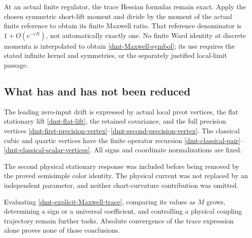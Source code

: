 At an actual finite regulator, the trace Hessian formulas
remain exact. Apply the chosen symmetric short-lift
moment and divide by the moment of the actual finite
reference to obtain its finite Maxwell ratio. That
reference denominator is \(1+O(e^{-cN})\), not
automatically exactly one. No finite Ward identity at
discrete momenta is interpolated to obtain
\eqref{dmt-Maxwell-symbol}; its use requires the stated
infinite kernel and symmetries, or the separately
justified local-limit passage.

\subsection{What has and has not been reduced}
\label{dmt-scope-section}

The leading zero-input drift is expressed by actual local
pivot vertices, the flat stationary lift
\eqref{dmt-flat-lift}, the retained covariance, and the
full precision vertices
\eqref{dmt-first-precision-vertex}--\eqref{dmt-second-precision-vertex}.
The classical cubic and quartic vertices have the finite
operator recursion
\eqref{dmt-classical-pair}--\eqref{dmt-classical-scalar-vertices}.
All signs and coordinate normalizations are fixed.

The second physical stationary response was included
before being removed by the proved semisimple color
identity. The physical current was not replaced by an
independent parameter, and neither chart-curvature
contribution was omitted.

Evaluating \eqref{dmt-explicit-Maxwell-trace}, comparing
its values as \(M\) grows, determining a sign or a
universal coefficient, and controlling a physical
coupling trajectory remain further tasks. Absolute
convergence of the trace expression alone proves none
of those conclusions.
